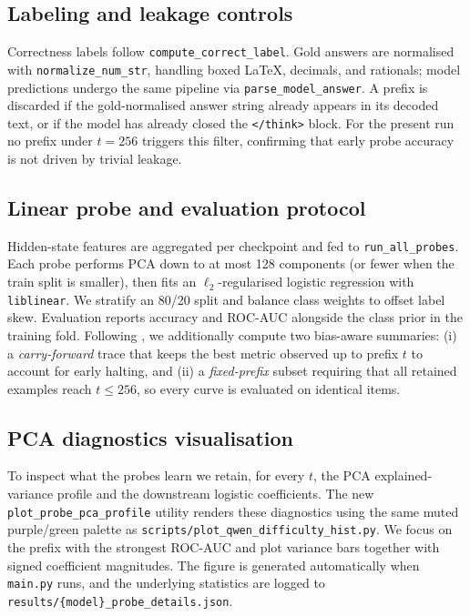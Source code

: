 \documentclass[10pt,a4paper,twocolumn]{article}
\begin{document}
\subsection{Labeling and leakage controls}
Correctness labels follow \texttt{compute\_correct\_label}.  Gold answers are normalised with \texttt{normalize\_num\_str}, handling boxed LaTeX, decimals, and rationals; model predictions undergo the same pipeline via \texttt{parse\_model\_answer}.  A prefix is discarded if the gold-normalised answer string already appears in its decoded text, or if the model has already closed the \verb|</think>| block.  For the present run no prefix under $t{=}256$ triggers this filter, confirming that early probe accuracy is not driven by trivial leakage.

\subsection{Linear probe and evaluation protocol}
Hidden-state features are aggregated per checkpoint and fed to \texttt{run\_all\_probes}.  Each probe performs PCA down to at most 128 components (or fewer when the train split is smaller), then fits an $\ell_2$-regularised logistic regression with \texttt{liblinear}.  We stratify an 80/20 split and balance class weights to offset label skew.  Evaluation reports accuracy and ROC-AUC alongside the class prior in the training fold.  Following \cite{mao2025earlystoppingchainofthoughtslarge}, we additionally compute two bias-aware summaries: (i) a \emph{carry-forward} trace that keeps the best metric observed up to prefix $t$ to account for early halting, and (ii) a \emph{fixed-prefix} subset requiring that all retained examples reach $t{\leq}256$, so every curve is evaluated on identical items.

\subsection{PCA diagnostics visualisation}
To inspect what the probes learn we retain, for every $t$, the PCA explained-variance profile and the downstream logistic coefficients.  The new \texttt{plot\_probe\_pca\_profile} utility renders these diagnostics using the same muted purple/green palette as \texttt{scripts/plot\_qwen\_difficulty\_hist.py}.  We focus on the prefix with the strongest ROC-AUC and plot variance bars together with signed coefficient magnitudes.  The figure is generated automatically when \texttt{main.py} runs, and the underlying statistics are logged to \texttt{results/\{model\}\_probe\_details.json}.
\end{document}
